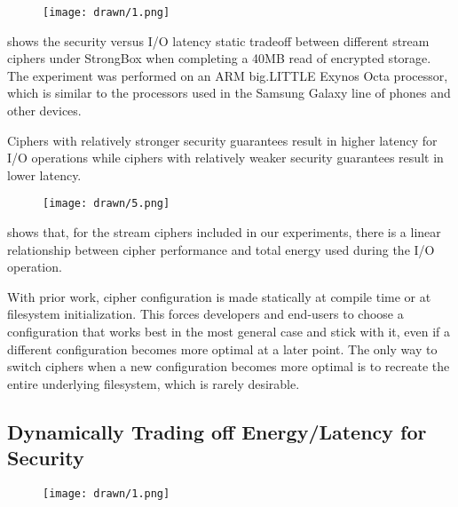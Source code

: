 \begin{figure}[ht]
 \centering
  \texttt{[image: drawn/1.png]}
   \caption{}\label{fig:40mb-read}
\end{figure}

 shows the security versus I/O latency static
tradeoff between different stream ciphers under StrongBox when completing a 40MB
read of encrypted storage. The experiment was performed on an ARM big.LITTLE
Exynos Octa processor, which is similar to the processors used in the Samsung
Galaxy line of phones and other devices. 

Ciphers with relatively stronger security guarantees result in higher latency
for I/O operations while ciphers with relatively weaker security guarantees
result in lower latency.

\begin{figure}[ht]
 \centering
  \texttt{[image: drawn/5.png]}
   \caption{}\label{fig:energy-latency-linearity}
\end{figure}

 shows that, for the stream ciphers included in
our experiments, there is a linear relationship between cipher performance and
total energy used during the I/O operation.

With prior work,  cipher configuration is made
statically at compile time or at filesystem initialization. This forces
developers and end-users to choose a configuration that works best in the most
general case and stick with it, even if a different configuration becomes more
optimal at a later point. The only way to switch ciphers when a new
configuration becomes more optimal is to recreate the entire underlying
filesystem, which is rarely desirable. 

\subsection{Dynamically Trading off Energy/Latency for Security}

\begin{figure}[ht]
 \centering
  \texttt{[image: drawn/1.png]}
   \caption{}\label{fig:40mb-read-with-forward}
\end{figure}

